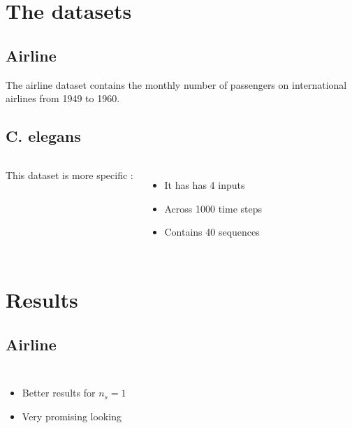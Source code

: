 \documentclass[14pt]{beamer}
\begin{document}
  \section{The datasets}
  \subsection{Airline}
  \begin{frame}{\insertsection}{\insertsubsection}
    The airline dataset contains the monthly number of passengers on international airlines from 1949 to 1960.
    
  \end{frame}

  \subsection{C. elegans}
  \begin{frame}{\insertsection}{\insertsubsection}
    \begin{columns}
      This dataset is more specific :
      \begin{itemize}
        \item It has has 4 inputs
        \item Across 1000 time steps
        \item Contains 40 sequences
      \end{itemize}
      
    \end{columns}
  \end{frame}

  \section{Results}
  \subsection{Airline}
  \begin{frame}{\insertsection}{\insertsubsection}
    \begin{columns}
      
      \begin{itemize}
        \item Better results for $n_s=1$
        \item Very promising looking
      \end{itemize}
    \end{columns}
  \end{frame}
\end{document}
